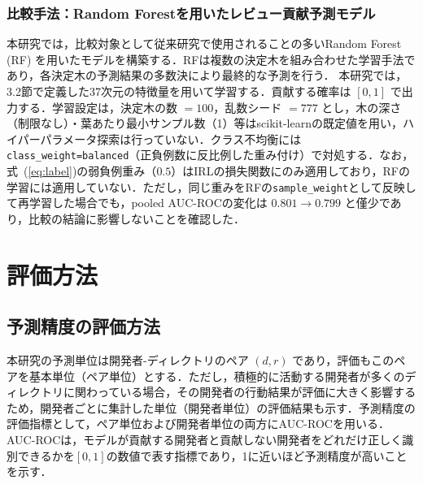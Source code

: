 \documentclass[submit,noauthor,ses,dvipdfmx]{ipsj}
\newcommand{\todo}[1]{\colorbox{yellow}{{\bf TODO}:}{\color{red} {\textbf{[#1]}}}}
\begin{document}


\subsubsection{比較手法：Random Forestを用いたレビュー貢献予測モデル}\label{sec:rf}
本研究では，比較対象として従来研究で使用されることの多いRandom Forest (RF) を用いたモデルを構築する．RFは複数の決定木を組み合わせた学習手法であり，各決定木の予測結果の多数決により最終的な予測を行う．
本研究では，3.2節で定義した37次元の特徴量を用いて学習する\cite{breiman_rf}．貢献する確率は $[0, 1]$ で出力する．学習設定は，決定木の数 $= 100$，乱数シード $= 777$ とし，木の深さ（制限なし）・葉あたり最小サンプル数（1）等はscikit-learnの既定値を用い，ハイパーパラメータ探索は行っていない．クラス不均衡には\texttt{class\_weight=balanced}（正負例数に反比例した重み付け）で対処する．なお，式~(\ref{eq:label})の弱負例重み（$0.5$）はIRLの損失関数にのみ適用しており，RFの学習には適用していない．ただし，同じ重みをRFの\texttt{sample\_weight}として反映して再学習した場合でも，pooled AUC-ROCの変化は $0.801 \to 0.799$ と僅少であり，比較の結論に影響しないことを確認した．

\section{評価方法}\label{sec:evaluation}

\subsection{予測精度の評価方法}
本研究の予測単位は開発者-ディレクトリのペア $(d, r)$ であり，評価もこのペアを基本単位（ペア単位）とする．ただし，積極的に活動する開発者が多くのディレクトリに関わっている場合，その開発者の行動結果が評価に大きく影響するため，開発者ごとに集計した単位（開発者単位）の評価結果も示す．予測精度の評価指標として，ペア単位および開発者単位の両方にAUC-ROCを用いる．AUC-ROCは，モデルが貢献する開発者と貢献しない開発者をどれだけ正しく識別できるかを$[0, 1]$の数値で表す指標であり，1に近いほど予測精度が高いことを示す．
\end{document}
